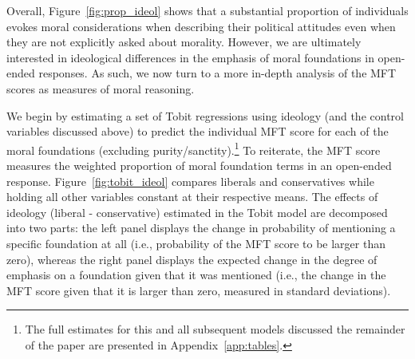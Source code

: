 \documentclass[12pt]{article}
\begin{document}
Overall, Figure~\ref{fig:prop_ideol} shows that a substantial proportion of individuals evokes moral considerations when describing their political attitudes even when they are not explicitly asked about morality. However, we are ultimately interested in ideological differences in the emphasis of moral foundations in open-ended responses. As such, we now turn to a more in-depth analysis of the MFT scores as measures of moral reasoning.

We begin by estimating a set of Tobit regressions using ideology (and the control variables discussed above) to predict the individual MFT score for each of the moral foundations (excluding purity/sanctity).\footnote{The full estimates for this and all subsequent models discussed the remainder of the paper are presented in Appendix~\ref{app:tables}.} To reiterate, the MFT score measures the weighted proportion of moral foundation terms in an open-ended response. Figure~\ref{fig:tobit_ideol} compares liberals and conservatives while holding all other variables constant at their respective means. The effects of ideology (liberal - conservative) estimated in the Tobit model are decomposed into two parts: the left panel displays the change in probability of mentioning a specific foundation at all (i.e., probability of the MFT score to be larger than zero), whereas the right panel displays the expected change in the degree of emphasis on a foundation given that it was mentioned  (i.e., the change in the MFT score given that it is larger than zero, measured in standard deviations).
\end{document}
